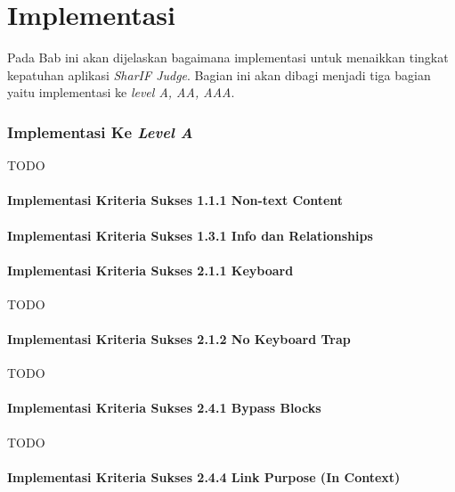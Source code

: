 \chapter{Implementasi}
\label{chap:implementasi}

Pada Bab ini akan dijelaskan bagaimana implementasi untuk menaikkan tingkat kepatuhan aplikasi \textit{SharIF Judge}. Bagian ini akan dibagi menjadi tiga bagian yaitu implementasi ke \textit{level A, AA, AAA}.

\subsection{Implementasi Ke \textit{Level A}}
\label{subsec:implementasi_A}
TODO

\subsubsection{Implementasi Kriteria Sukses 1.1.1 Non-text Content}
\label{subsubsec:implementasi_A_1.1.1}

\subsubsection{Implementasi Kriteria Sukses 1.3.1 Info dan Relationships}
\label{subsubsec:implementasi_A_1.3.1}

\subsubsection{Implementasi Kriteria Sukses 2.1.1 Keyboard}
\label{subsubsec:implementasi_A_2.1.1}
TODO

\subsubsection{Implementasi Kriteria Sukses 2.1.2 No Keyboard Trap}
\label{subsubsec:implementasi_A_2.1.2}
TODO

\subsubsection{Implementasi Kriteria Sukses 2.4.1 Bypass Blocks}
\label{subsubsec:implementasi_A_2.4.1}
TODO

\subsubsection{Implementasi Kriteria Sukses 2.4.4 Link Purpose (In Context)}
\label{subsubsec:implementasi_A_2.4.4}

